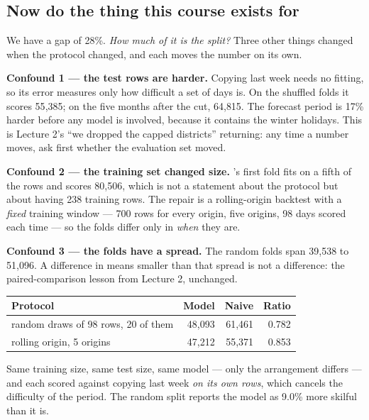 \documentclass[11pt,a4paper]{article}
\begin{document}
\subsection{Now do the thing this course exists for}

We have a gap of 28\%. \emph{How much of it is the split?} Three other things
changed when the protocol changed, and each moves the number on its own.

\textbf{Confound 1 --- the test rows are harder.} Copying last week needs no
fitting, so its error measures only how difficult a set of days is. On the
shuffled folds it scores 55{,}385; on the five months after the cut, 64{,}815.
The forecast period is 17\% harder before any model is involved, because it
contains the winter holidays. This is Lecture 2's ``we dropped the capped
districts'' returning: any time a number moves, ask first whether the
evaluation set moved.

\textbf{Confound 2 --- the training set changed size.}
's first fold fits on a fifth of the rows and scores
80{,}506, which is not a statement about the protocol but about having 238
training rows. The repair is a rolling-origin backtest with a \emph{fixed}
training window --- 700 rows for every origin, five origins, 98 days scored
each time --- so the folds differ only in \emph{when} they are.

\textbf{Confound 3 --- the folds have a spread.} The random folds span 39{,}538
to 51{,}096. A difference in means smaller than that spread is not a
difference: the paired-comparison lesson from Lecture 2, unchanged.

\begin{center}
\small
\begin{tabular}{lrrr}
\toprule
\textbf{Protocol} & \textbf{Model} & \textbf{Naive} & \textbf{Ratio} \\
\midrule
random draws of 98 rows, 20 of them & 48{,}093 & 61{,}461 & 0.782 \\
rolling origin, 5 origins & 47{,}212 & 55{,}371 & 0.853 \\
\bottomrule
\end{tabular}
\end{center}

Same training size, same test size, same model --- only the arrangement differs
--- and each scored against copying last week \emph{on its own rows}, which
cancels the difficulty of the period. The random split reports the model as
9.0\% more skilful than it is.
\end{document}
